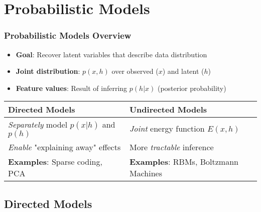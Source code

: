 \documentclass{beamer}
\begin{document}
\section{Probabilistic Models}

\begin{frame}[fragile]
\frametitle{Probabilistic Models Overview}
\begin{itemize}
\item \textbf{Goal}: Recover latent variables that describe data distribution
\item \textbf{Joint distribution}: $p(x, h)$ over observed ($x$) and latent ($h$)
\item \textbf{Feature values}: Result of inferring $p(h|x)$ (posterior probability)
\end{itemize}
\pause

\begin{center}
\begin{tabular}{m{}|m{}}
\toprule
\rowcolor{bgsubrown!20}
\textbf{Directed Models} & \textbf{Undirected Models} \\
\midrule
\textit{Separately} model $p(x|h)$ and $p(h)$ & \textit{Joint} energy function $E(x,h)$ \\
\midrule
\textit{Enable} "explaining away" effects & More \textit{tractable} inference \\
\midrule
\textbf{Examples}: Sparse coding, PCA & \textbf{Examples}: RBMs, Boltzmann Machines \\
\bottomrule
\end{tabular}
\end{center}
\end{frame}

\subsection{Directed Models}
\end{document}
